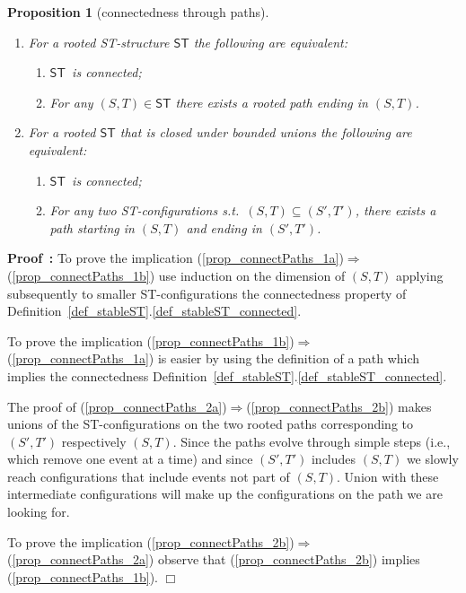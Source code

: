 \documentclass[submission,copyright,creativecommons]{eptcs}
\newtheorem{proposition}[theorem]{Proposition}
\newenvironment{proof}[1][\!\!\,]{\vspace{1ex}\noindent\textbf{Proof #1: }}{\hfill$\Box$\vspace{2ex}}
\newcommand\ST{\ensuremath{\mathsf{ST}}}
\begin{document}
\begin{proposition}[connectedness through paths]\label{prop_connectPaths}\ 
\begin{enumerate}
\item\label{prop_connectPaths_1} For a rooted ST-structure $\ST$ the following are equivalent:
\begin{enumerate}
\item\label{prop_connectPaths_1a} \ST\ is connected;
\item\label{prop_connectPaths_1b} For any $(S,T)\in\ST$ there exists a rooted path ending in $(S,T)$.
\end{enumerate}
\item\label{prop_connectPaths_2} For a rooted $\ST$ that is closed under bounded unions the following are equivalent:
\begin{enumerate}
\item\label{prop_connectPaths_2a} \ST\ is connected;
\item\label{prop_connectPaths_2b} For any two ST-configurations s.t.\ $(S,T)\!\subseteq\!(S',T')$, there exists a path starting in $(S,T)$ and ending in $(S',T')$.
\end{enumerate}
\end{enumerate}
\end{proposition}

\begin{proof}
To prove the implication (\ref{prop_connectPaths_1a})$\Rightarrow$(\ref{prop_connectPaths_1b}) use induction on the dimension of $(S,T)$ applying subsequently to smaller ST-configurations the connectedness property of Definition~\ref{def_stableST}.\ref{def_stableST_connected}.

To prove the implication (\ref{prop_connectPaths_1b})$\Rightarrow$(\ref{prop_connectPaths_1a}) is easier by using the definition of a path which implies the connectedness Definition~\ref{def_stableST}.\ref{def_stableST_connected}.

The proof of (\ref{prop_connectPaths_2a})$\Rightarrow$(\ref{prop_connectPaths_2b}) makes unions of the ST-configurations on the two rooted paths corresponding to $(S',T')$ respectively $(S,T)$. Since the paths evolve through simple steps (i.e., which remove one event at a time) and since $(S',T')$ includes $(S,T)$ we slowly reach configurations that include events not part of $(S,T)$. Union with these intermediate configurations will make up the configurations on the path we are looking for.

To prove the implication (\ref{prop_connectPaths_2b})$\Rightarrow$(\ref{prop_connectPaths_2a}) observe that (\ref{prop_connectPaths_2b}) implies (\ref{prop_connectPaths_1b}).
\end{proof}
\end{document}
